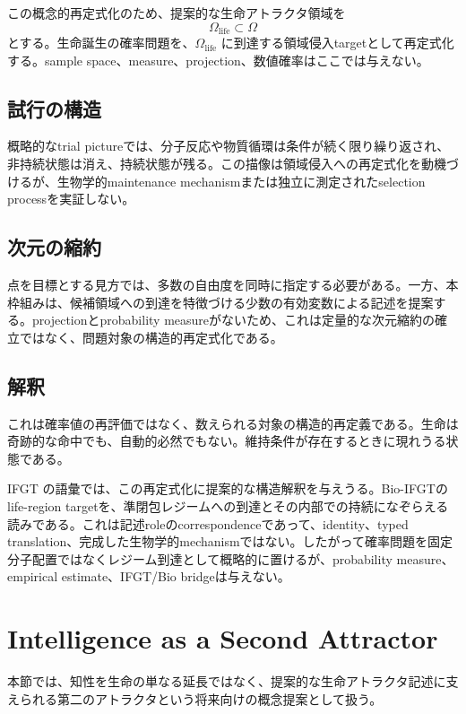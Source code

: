 \documentclass[11pt]{ltjsarticle}
\begin{document}
この概念的再定式化のため、提案的な生命アトラクタ領域を
\begin{equation}
  \Omega_{\mathrm{life}}\subset\Omega
\end{equation}
とする。生命誕生の確率問題を、\(\Omega_{\mathrm{life}}\) に到達する領域侵入targetとして再定式化する。sample space、measure、projection、数値確率はここでは与えない。

\subsection{試行の構造}

概略的なtrial pictureでは、分子反応や物質循環は条件が続く限り繰り返され、非持続状態は消え、持続状態が残る。この描像は領域侵入への再定式化を動機づけるが、生物学的maintenance mechanismまたは独立に測定されたselection processを実証しない。

\subsection{次元の縮約}

点を目標とする見方では、多数の自由度を同時に指定する必要がある。一方、本枠組みは、候補領域への到達を特徴づける少数の有効変数による記述を提案する。projectionとprobability measureがないため、これは定量的な次元縮約の確立ではなく、問題対象の構造的再定式化である。

\subsection{解釈}

これは確率値の再評価ではなく、数えられる対象の構造的再定義である。生命は奇跡的な命中でも、自動的必然でもない。維持条件が存在するときに現れうる状態である。

IFGT の語彙では、この再定式化に提案的な構造解釈を与えうる。Bio-IFGTのlife-region targetを、準閉包レジームへの到達とその内部での持続になぞらえる読みである。これは記述roleのcorrespondenceであって、identity、typed translation、完成した生物学的mechanismではない。したがって確率問題を固定分子配置ではなくレジーム到達として概略的に置けるが、probability measure、empirical estimate、IFGT/Bio bridgeは与えない。

\section{Intelligence as a Second Attractor}

本節では、知性を生命の単なる延長ではなく、提案的な生命アトラクタ記述に支えられる第二のアトラクタという将来向けの概念提案として扱う。
\end{document}
